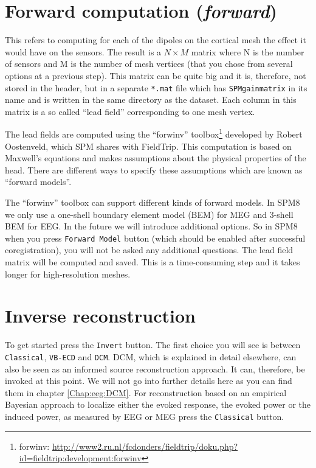 \section{Forward computation (\textit{forward})}
This refers to computing for each of the dipoles on the cortical mesh the effect it would have on the sensors. The result is a $N \times M$ matrix where N is the number of sensors and M is the number of mesh vertices (that you chose from several options at a previous step). This matrix can be quite big and it is, therefore, not stored in the header, but in a separate \texttt{*.mat} file which has \texttt{SPMgainmatrix} in its name and is written in the same directory as the dataset. Each column in this matrix is a so called ``lead field'' corresponding to one mesh vertex.

The lead fields are computed using the ``forwinv'' toolbox\footnote{forwinv: \url{http://www2.ru.nl/fcdonders/fieldtrip/doku.php?id=fieldtrip:development:forwinv}} developed by Robert Oostenveld, which SPM shares with FieldTrip. This computation is based on Maxwell's equations and makes assumptions about the physical properties of the head. There are different ways to specify these assumptions which are known as ``forward models''.

The ``forwinv'' toolbox can support different kinds of forward models. In SPM8 we only use a one-shell boundary element model (BEM) for MEG and 3-shell BEM for EEG. In the future we will introduce additional options. So in SPM8 when you press \texttt{Forward Model} button (which should be enabled after successful coregistration), you will not be asked any additional questions. The lead field matrix will be computed and saved. This is a time-consuming step and it takes longer for high-resolution meshes.


\section{Inverse reconstruction}
To get started press the \texttt{Invert} button. The first choice you will see is between \texttt{Classical}, \texttt{VB-ECD} and \texttt{DCM}. DCM, which is explained in detail elsewhere, can also be seen as an informed source reconstruction approach. It can, therefore, be invoked at this point. We will not go into further details here as you can find them in chapter \ref{Chap:eeg:DCM}. For reconstruction based on an empirical Bayesian approach to localize either the evoked response, the evoked power or the induced power, as measured by EEG or MEG press the \texttt{Classical} button. 


